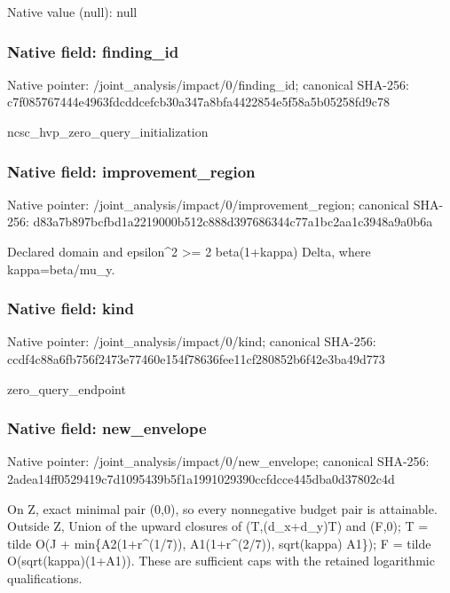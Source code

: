 \documentclass[10pt,a4paper]{article}
\begin{document}
Native value (null): null

\subsubsection{Native field: finding\_\allowbreak{}id}
Native pointer: /joint\_\allowbreak{}analysis/impact/0/finding\_\allowbreak{}id; canonical SHA-256: c7f085767444e4963fdcddcefcb30a347a8bfa4422854e5f58a5b05258fd9c78

\begingroup\raggedright\sloppy ncsc\_\allowbreak{}hvp\_\allowbreak{}zero\_\allowbreak{}query\_\allowbreak{}initialization\par\endgroup

\subsubsection{Native field: improvement\_\allowbreak{}region}
Native pointer: /joint\_\allowbreak{}analysis/impact/0/improvement\_\allowbreak{}region; canonical SHA-256: d83a7b897bcfbd1a2219000b512c888d397686344c77a1bc2aa1c3948a9a0b6a

\begingroup\raggedright\sloppy Declared domain and epsilon\textasciicircum{}2 >=\allowbreak{} 2 beta(1+kappa) Delta,\allowbreak{} where kappa=\allowbreak{}beta/\allowbreak{}mu\_\allowbreak{}y.\par\endgroup

\subsubsection{Native field: kind}
Native pointer: /joint\_\allowbreak{}analysis/impact/0/kind; canonical SHA-256: ccdf4c88a6fb756f2473e77460e154f78636fee11cf280852b6f42e3ba49d773

\begingroup\raggedright\sloppy zero\_\allowbreak{}query\_\allowbreak{}endpoint\par\endgroup

\subsubsection{Native field: new\_\allowbreak{}envelope}
Native pointer: /joint\_\allowbreak{}analysis/impact/0/new\_\allowbreak{}envelope; canonical SHA-256: 2adea14ff0529419c7d1095439b5f1a1991029390ccfdcce445dba0d37802c4d

\begingroup\raggedright\sloppy On Z,\allowbreak{} exact minimal pair (0,\allowbreak{}0),\allowbreak{} so every nonnegative budget pair is attainable. Outside Z,\allowbreak{} Union of the upward closures of (T,\allowbreak{}(d\_\allowbreak{}x+d\_\allowbreak{}y)T) and (F,\allowbreak{}0);\allowbreak{} T =\allowbreak{} tilde O(J + min\{A2(1+r\textasciicircum{}(1/\allowbreak{}7)),\allowbreak{} A1(1+r\textasciicircum{}(2/\allowbreak{}7)),\allowbreak{} sqrt(kappa) A1\});\allowbreak{} F =\allowbreak{} tilde O(sqrt(kappa)(1+A1)). These are sufficient caps with the retained logarithmic qualifications.\par\endgroup
\end{document}

